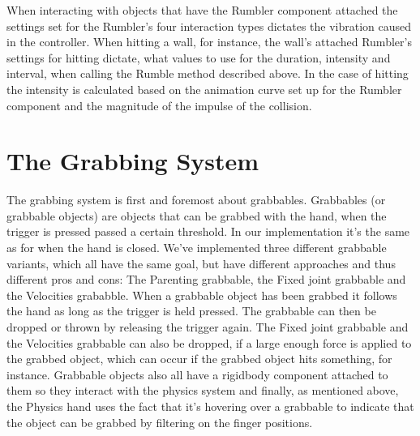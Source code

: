 When interacting with objects that have the Rumbler component attached the settings set for the Rumbler's four interaction types dictates the vibration caused in the controller. When hitting a wall, for instance, the wall's attached Rumbler's settings for hitting dictate, what values to use for the duration, intensity and interval, when calling the Rumble method described above. In the case of hitting the intensity is calculated based on the animation curve set up for the Rumbler component and the magnitude of the impulse of the collision.




\section{The Grabbing System}
\label{sec:grabbingSystem}
The grabbing system is first and foremost about grabbables. Grabbables (or grabbable objects) are objects that can be grabbed with the hand, when the trigger is pressed passed a certain threshold. In our implementation it's the same as for when the hand is closed. We've implemented three different grabbable variants, which all have the same goal, but have different approaches and thus different pros and cons: The Parenting grabbable, the Fixed joint grabbable and the Velocities grababble. When a grabbable object has been grabbed it follows the hand as long as the trigger is held pressed. The grabbable can then be dropped or thrown by releasing the trigger again. The Fixed joint grabbable and the Velocities grabbable can also be dropped, if a large enough force is applied to the grabbed object, which can occur if the grabbed object hits something, for instance. Grabbable objects also all have a rigidbody component attached to them so they interact with the physics system and finally, as mentioned above, the Physics hand uses the fact that it's hovering over a grabbable to indicate that the object can be grabbed by filtering on the finger positions.

